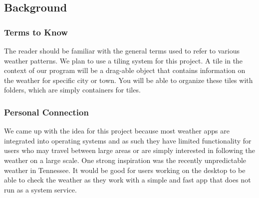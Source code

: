 \documentclass[10pt,conference,onecolumn,compsoc]{IEEEtran}
\begin{document}




\subsection{Background}
\subsubsection{Terms to Know}
	The reader should be familiar with the general terms used to refer to various weather patterns. We plan to use a tiling system for this project. A tile in the context of our program will be a drag-able object that contains information on the weather for specific city or town.
You will be able to organize these tiles with folders, which are simply containers for tiles. 
\subsubsection{Personal Connection}	
	 We came up with the idea for this project because most weather apps are integrated into operating systems and as such they have limited functionality for users who may travel between large areas or are simply interested in following the weather on a large scale. One strong inspiration was the recently unpredictable weather in Tennessee. It would be good for users working on the desktop to be able to check the weather as they work with a simple and fast app that does not run as a system service. 

\end{document}
